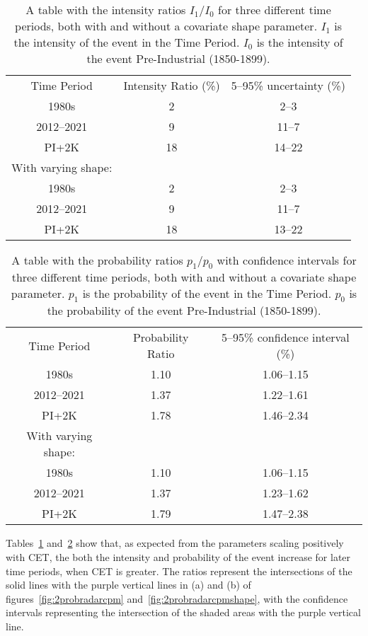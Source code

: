 \begin{table}[H]
   \centering
    \begin{tabular}{c c c}
        Time Period & Intensity Ratio (\%) & 5--95\% uncertainty (\%) \\
        1980s & 2 & 2--3 \\
        2012--2021 & 9 & 11--7 \\
        PI+2K & 18 & 14--22 \\
        With varying shape: && \\
        1980s & 2 & 2--3 \\
        2012--2021 & 9 & 11--7 \\
        PI+2K & 18 & 13--22 \\
    \end{tabular}
    \caption{A table with the intensity ratios $I_1/I_0$ for three different time periods,
        both with and without a covariate shape parameter.
    $I_1$ is the intensity of the event in the Time Period.
    $I_0$ is the intensity of the event Pre-Industrial (1850-1899).}
    \label{tab:irtable}
\end{table}

\begin{table}[H]
   \centering
    \begin{tabular}{c c c}
        Time Period & Probability Ratio & 5--95\% confidence interval (\%) \\
        1980s & 1.10 & 1.06--1.15 \\
        2012--2021 & 1.37 & 1.22--1.61 \\
        PI+2K & 1.78 & 1.46--2.34 \\
        With varying shape: && \\
        1980s & 1.10 & 1.06--1.15 \\
        2012--2021 & 1.37 & 1.23--1.62 \\
        PI+2K & 1.79 & 1.47--2.38 \\
    \end{tabular}
    \caption{A table with the probability ratios $p_1/p_0$ with confidence intervals for three different time periods,
        both with and without a covariate shape parameter.
    $p_1$ is the probability of the event in the Time Period.
    $p_0$ is the probability of the event Pre-Industrial (1850-1899).}
    \label{tab:prtable}
\end{table}

Tables~\ref{tab:irtable} and~\ref{tab:prtable} show that,
    as expected from the parameters scaling positively with CET,
    the both the intensity and probability of the event increase for later time periods,
    when CET is greater.
The ratios represent the intersections of the solid lines with the purple vertical lines in (a) and (b)
    of figures~\ref{fig:2probradarcpm} and~\ref{fig:2probradarcpmshape},
    with the confidence intervals representing the intersection of the shaded areas with the purple vertical line.

